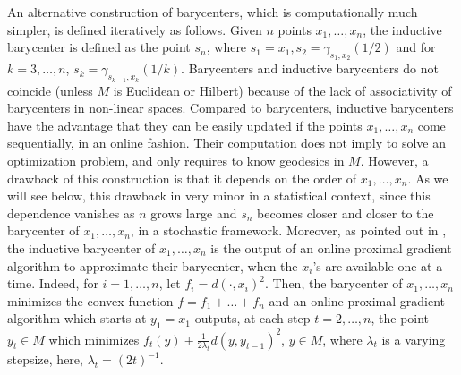 \documentclass[10pt,a4paper]{article}
\theoremstyle{plain}
\theoremstyle{definition}
\theoremstyle{remark}
\begin{document}

An alternative construction of barycenters, which is computationally much simpler, is defined iteratively as follows.  
Given $n$ points $x_1,\ldots,x_n$, the inductive barycenter is defined as the point $s_n$, where $s_1=x_1, s_2=\gamma_{s_1,x_2}(1/2)$ and for $k=3,\ldots,n$, $s_k=\gamma_{s_{k-1},x_k}(1/k)$.
Barycenters and inductive barycenters do not coincide (unless $M$ is Euclidean or Hilbert) because of the lack of associativity of barycenters in non-linear spaces. Compared to barycenters, inductive barycenters have the advantage that they can be easily updated if the points $x_1,\ldots,x_n$ come sequentially, in an online fashion. Their computation does not imply to solve an optimization problem, and only requires to know geodesics in $M$. However, a drawback of this construction is that it depends on the order of $x_1,\ldots,x_n$. As we will see below, this drawback in very minor in a statistical context, since this dependence vanishes as $n$ grows large and $s_n$ becomes closer and closer to the barycenter of $x_1,\ldots,x_n$, in a stochastic framework. Moreover, as pointed out in \cite{ohtapalfia}, the inductive barycenter of $x_1,\ldots,x_n$ is the output of an online proximal gradient algorithm to approximate their barycenter, when the $x_i$'s are available one at a time. Indeed, for $i=1,\ldots,n$, let $f_i=d(\cdot,x_i)^2$. Then, the barycenter of $x_1,\ldots,x_n$ minimizes the convex function $f=f_1+\ldots+f_n$ and an online proximal gradient algorithm which starts at $y_1=x_1$ outputs, at each step $t=2,\ldots,n$, the point $y_t\in M$ which minimizes $f_t(y)+\frac{1}{2\lambda_t} d(y,y_{t-1})^2$, $y\in M$, where $\lambda_t$ is a varying stepsize, here, $\lambda_t=(2t)^{-1}$.
\end{document}
